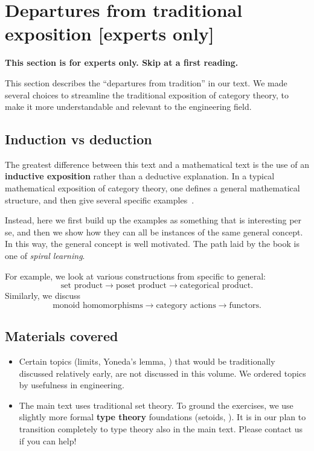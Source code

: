 
\section[Departures from tradition]{Departures from traditional exposition [experts only]}

\textbf{This section is for experts only.
    Skip at a first reading.
}

This section describes the ``departures from tradition'' in our text.
We made several choices to streamline the traditional exposition of category theory, to make it more understandable and relevant to the engineering field.

\subsection{Induction vs deduction}

The greatest difference between this text and a mathematical text is the use of an \textbf{inductive exposition} rather than a deductive explanation.
In a typical mathematical exposition of category theory, one defines a general mathematical structure, and then give several specific examples~\cite{riehl2017category}.

Instead, here we first build up the examples as something that is interesting per se, and then we show how they can all be instances of the same general concept.
In this way, the general concept is well motivated.
The path laid by the book is one of \emph{spiral learning}.

For example, we look at various constructions from specific to general:
%
\begin{equation}
    \text{set product} \rightarrow \text{poset product} \rightarrow \text{categorical product}.
\end{equation}
%
Similarly, we discuss
%
\begin{equation}
    \text{monoid homomorphisms} \rightarrow \text{category actions} \rightarrow \text{functors}.
\end{equation}

\subsection{Materials covered}
\begin{itemize}
    \item Certain topics (limits, Yoneda's lemma, \etc) that would be traditionally discussed relatively early, are not discussed in this volume.
          We ordered topics by usefulness in engineering.

    \item The main text uses traditional set theory.
          To ground the exercises, we use slightly more formal \textbf{type theory} foundations (setoids, \etc).
          It is in our plan to transition completely to type theory also in the main text.
          Please contact us if you can help!

\end{itemize}

